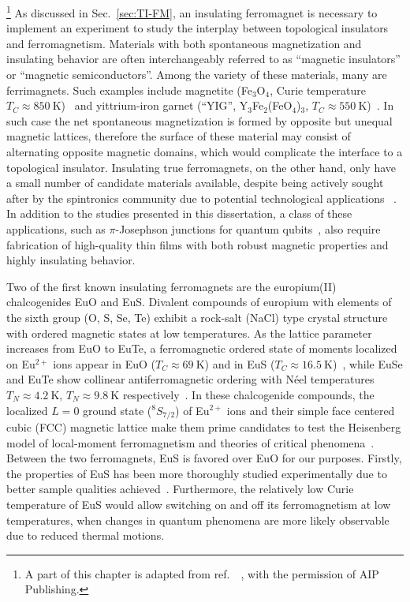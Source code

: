 \footnote[2]{A part of this chapter is adapted from ref.~\cite{EuS_PLD}~, with the permission of AIP Publishing.}%
As discussed in Sec.~\ref{sec:TI-FM}, an insulating ferromagnet is necessary to implement an experiment to study the interplay between topological insulators and ferromagnetism. Materials with both spontaneous magnetization and insulating behavior are often interchangeably referred to as ``magnetic insulators'' or ``magnetic semiconductors''. Among the variety of these materials, many are ferrimagnets. Such examples include magnetite (Fe$_3$O$_4$, Curie temperature $T_C\approx850~\mathrm{K}$)~\cite{Neel1948} and yittrium-iron garnet (``YIG'', Y$_3$Fe$_2$(FeO$_4$)$_3$, $T_C\approx550~\mathrm{K}$)~\cite{YIG}. In such case the net spontaneous magnetization is formed by opposite but unequal magnetic lattices, therefore the surface of these material may consist of alternating opposite magnetic domains, which would complicate the interface to a topological insulator. Insulating true ferromagnets, on the other hand, only have a small number of candidate materials available, despite being actively sought after by the spintronics community due to potential technological applications \cite[][p.~329]{kittel}~\cite{Yi2014, Wolf2001, EuS_spin_filter, EuS_app1, EuS_spin_filter2}. In addition to the studies presented in this dissertation, a class of these applications, such as $\pi$-Josephson junctions for quantum qubits~\cite{pi_qubit, pi_junction, Jing}, also require fabrication of high-quality thin films with both robust magnetic properties and highly insulating behavior.

Two of the first known insulating ferromagnets are the europium(II) chalcogenides EuO and EuS. Divalent compounds of europium with elements of the sixth group (O, S, Se, Te) exhibit a rock-salt (NaCl) type crystal structure with ordered magnetic states at low temperatures. As the lattice parameter increases from EuO to EuTe, a ferromagnetic ordered state of moments localized on Eu$^{2+}$ ions appear in EuO ($T_C\approx69~\mathrm{K}$) and in EuS ($T_C\approx16.5~\mathrm{K}$)~\cite{EuO_TC, EuS_Shafer, EuS_specific_heat}, while EuSe and EuTe show collinear antiferromagnetic ordering with N\'eel temperatures $T_N\approx4.2~\mathrm{K}$, $T_N\approx9.8~\mathrm{K}$ respectively~\cite{EuSe_AF, EuTe_AF}. In these chalcogenide compounds, the localized $L=0$ ground state ($^8S_{7/2}$) of Eu$^{2+}$ ions and their simple face centered cubic (FCC) magnetic lattice make them prime candidates to test the Heisenberg model of local-moment ferromagnetism and theories of critical phenomena~\cite{divalent_Eu,  EuS_neighbor_exchange, EuS_critical, EuS_neutron, EuS_spin_wave}. Between the two ferromagnets, EuS is favored over EuO for our purposes. Firstly, the properties of EuS has been more thoroughly studied experimentally due to better sample qualities achieved~\cite{EuS_band_th2}. Furthermore, the relatively low Curie temperature of EuS would allow switching on and off its ferromagnetism at low temperatures, when changes in quantum phenomena are more likely observable due to reduced thermal motions.


